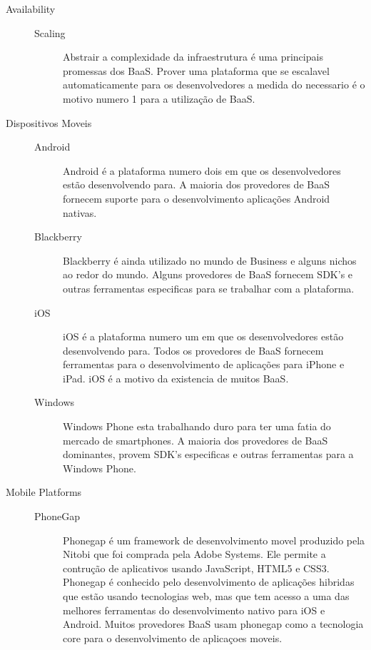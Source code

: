\begin{description}
		\item[Availability]
			\begin{description}
				\item[]
                \item[Scaling] { Abstrair a complexidade da infraestrutura é uma principais promessas dos BaaS. Prover uma plataforma que se escalavel automaticamente para os desenvolvedores a medida do necessario é o motivo numero 1 para a utilização de BaaS.}
			\end{description}

		\item[Dispositivos Moveis]
			\begin{description}
				\item[]
                \item[Android] { Android é a plataforma numero dois em que os desenvolvedores estão desenvolvendo para. A maioria dos provedores de BaaS fornecem suporte para o desenvolvimento aplicações Android nativas. }

				\item[Blackberry] { Blackberry é ainda utilizado no mundo de Business e alguns nichos ao redor do mundo. Alguns provedores de BaaS fornecem SDK's e outras ferramentas especificas para se trabalhar com a plataforma. }
				
				\item[iOS] { iOS é a plataforma numero um em que os desenvolvedores estão desenvolvendo para. Todos os provedores de BaaS fornecem ferramentas para o desenvolvimento de aplicações para iPhone e iPad. iOS é a motivo da existencia de muitos BaaS. }
				
				\item[Windows] { Windows Phone esta trabalhando duro para ter uma fatia do mercado de smartphones. A maioria dos provedores de BaaS dominantes, provem SDK's especificas e outras ferramentas para a Windows Phone.}
			\end{description}

		\item[Mobile Platforms]
			\begin{description}
				\item[]
                \item[PhoneGap] { Phonegap é um framework de desenvolvimento movel produzido pela Nitobi que foi comprada pela Adobe Systems. Ele permite a contrução de aplicativos usando JavaScript, HTML5 e CSS3. Phonegap é conhecido pelo desenvolvimento de aplicações hibridas que estão usando tecnologias web, mas que tem acesso a uma das melhores ferramentas do desenvolvimento nativo para iOS e Android. Muitos provedores BaaS usam phonegap como a tecnologia core para o desenvolvimento de aplicaçoes moveis. }


\end{description}
\end{description}
